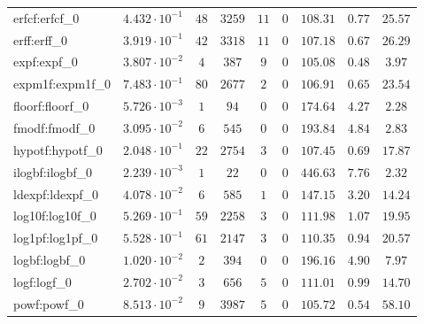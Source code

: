 \begin{tabular}{|l|c|c|c|c|c|c|c|c|}
erfcf:erfcf\_0               & $ 4.432 \cdot 10^{-1} $ & $ 48     $ & $ 3259  $ & $ 11  $ & $ 0   $ & $ 108.31      $ & $ 0.77    $ & $ 25.57   $ \\
erff:erff\_0                 & $ 3.919 \cdot 10^{-1} $ & $ 42     $ & $ 3318  $ & $ 11  $ & $ 0   $ & $ 107.18      $ & $ 0.67    $ & $ 26.29   $ \\
expf:expf\_0                 & $ 3.807 \cdot 10^{-2} $ & $ 4      $ & $ 387   $ & $ 9   $ & $ 0   $ & $ 105.08      $ & $ 0.48    $ & $ 3.97    $ \\
expm1f:expm1f\_0             & $ 7.483 \cdot 10^{-1} $ & $ 80     $ & $ 2677  $ & $ 2   $ & $ 0   $ & $ 106.91      $ & $ 0.65    $ & $ 23.54   $ \\
floorf:floorf\_0             & $ 5.726 \cdot 10^{-3} $ & $ 1      $ & $ 94    $ & $ 0   $ & $ 0   $ & $ 174.64      $ & $ 4.27    $ & $ 2.28    $ \\
fmodf:fmodf\_0               & $ 3.095 \cdot 10^{-2} $ & $ 6      $ & $ 545   $ & $ 0   $ & $ 0   $ & $ 193.84      $ & $ 4.84    $ & $ 2.83    $ \\
hypotf:hypotf\_0             & $ 2.048 \cdot 10^{-1} $ & $ 22     $ & $ 2754  $ & $ 3   $ & $ 0   $ & $ 107.45      $ & $ 0.69    $ & $ 17.87   $ \\
ilogbf:ilogbf\_0             & $ 2.239 \cdot 10^{-3} $ & $ 1      $ & $ 22    $ & $ 0   $ & $ 0   $ & $ 446.63      $ & $ 7.76    $ & $ 2.32    $ \\
ldexpf:ldexpf\_0             & $ 4.078 \cdot 10^{-2} $ & $ 6      $ & $ 585   $ & $ 1   $ & $ 0   $ & $ 147.15      $ & $ 3.20    $ & $ 14.24   $ \\
log10f:log10f\_0             & $ 5.269 \cdot 10^{-1} $ & $ 59     $ & $ 2258  $ & $ 3   $ & $ 0   $ & $ 111.98      $ & $ 1.07    $ & $ 19.95   $ \\
log1pf:log1pf\_0             & $ 5.528 \cdot 10^{-1} $ & $ 61     $ & $ 2147  $ & $ 3   $ & $ 0   $ & $ 110.35      $ & $ 0.94    $ & $ 20.57   $ \\
logbf:logbf\_0               & $ 1.020 \cdot 10^{-2} $ & $ 2      $ & $ 394   $ & $ 0   $ & $ 0   $ & $ 196.16      $ & $ 4.90    $ & $ 7.97    $ \\
logf:logf\_0                 & $ 2.702 \cdot 10^{-2} $ & $ 3      $ & $ 656   $ & $ 5   $ & $ 0   $ & $ 111.01      $ & $ 0.99    $ & $ 14.70   $ \\
powf:powf\_0                 & $ 8.513 \cdot 10^{-2} $ & $ 9      $ & $ 3987  $ & $ 5   $ & $ 0   $ & $ 105.72      $ & $ 0.54    $ & $ 58.10   $ \\

\end{tabular}
